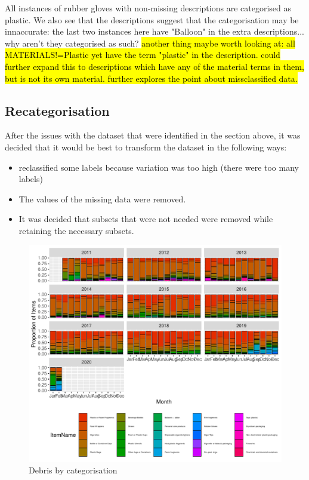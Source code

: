 \documentclass[10pt]{article}\usepackage[]{graphicx}\usepackage[]{color}
\newenvironment{knitrout}{}{} %
\begin{document}
All instances of rubber gloves with non-missing descriptions are categorised as plastic. We also see that the descriptions suggest that the categorisation may be innaccurate: the last two instances here have "Balloon" in the extra descriptions... why aren't they categorised as such?
\hl{another thing maybe worth looking at: all MATERIALS!=Plastic yet have the term "plastic" in the description. could further expand this to descriptions which have any of the material terms in them, but is not its own material. further explores the point about missclassified data.}





\subsection{Recategorisation}


After the issues with the dataset that were identified in the section above, it was decided that it would be best to transform the dataset in the following ways:
\begin{itemize}
\item reclassified some labels because variation was too high (there were too many labels)
\item The values of the missing data were removed.
\item It was decided that subsets that were not needed were removed while retaining the necessary subsets.
\end{itemize}

\begin{figure}[H] %
\begin{center}
\begin{knitrout}
\color{fgcolor}
\includegraphics[width=1\linewidth]{figure/unnamed-chunk-7-1} 

\end{knitrout}
\caption {Debris by categorisation}
\label{figE}
\end {center}
\end {figure}
\end{document}
